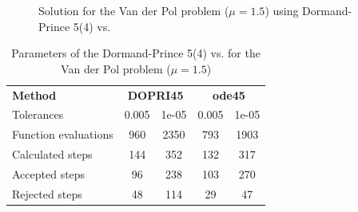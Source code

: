 \begin{figure}[H]
    \centering
    \caption{Solution for the Van der Pol problem ($\mathit{\mu = 1.5}$) using Dormand-Prince 5(4) vs. }
    \label{7_6_mu_1_5}
\end{figure}

\begin{table}[H]
    \centering
    \begin{tabular}{@{}l|cc|cc@{}}
    \toprule
    \textbf{Method}      & \multicolumn{2}{c|}{\textbf{DOPRI45}} & \multicolumn{2}{c}{\textbf{ode45}} \\
    Tolerances           & 0.005             & 1e-05             & 0.005            & 1e-05           \\ \midrule
    Function evaluations & 960               & 2350              & 793              & 1903            \\
    Calculated steps     & 144               & 352               & 132              & 317             \\
    Accepted steps       & 96                & 238               & 103              & 270             \\
    Rejected steps       & 48                & 114               & 29               & 47              \\ \bottomrule
    \end{tabular}
    \caption{Parameters of the Dormand-Prince 5(4) vs.  for the Van der Pol problem ($\mathit{\mu = 1.5}$)}
    \label{7_6_adaptive_mu_1_5_table}
\end{table}

